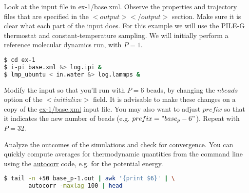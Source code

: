\documentclass{article}
\begin{document}
\begin{Exercise}[label={basic},title={A PIMD simulation of liquid water}]

\Question 
Look at the \ipi{} input file in \url{ex-1/base.xml}. Observe the 
properties and trajectory files that are specified in the \lstinxml$<output></output>$ section. 
Make sure it is clear what each part 
of the input does. For this example
we will use the PILE-G thermostat\cite{ceri+11jcp} and 
constant-temperature sampling. We will 
initially perform a reference molecular dynamics run, with $P=1$. 

\begin{lstlisting}[language=bash]
$ cd ex-1 
$ i-pi base.xml &> log.ipi &
$ lmp_ubuntu < in.water &> log.lammps & 
\end{lstlisting}%

\Question
Modify the input so that you'll run with
$P=6$ beads, by changing the \lstinxml$nbeads$ option of the \lstinxml$<initialize>$ field. 
It is advisable to make these changes on a copy of the  \url{ex-1/base.xml} input file.
You may also want to adjust \lstinxml$prefix$ so that it indicates the new number of beads (e.g. \lstinxml$prefix="base_p-6"$).
Repeat with $P=32$. 

\Question
Analyze the outcomes of the simulations and check for convergence. 
You can quickly compute averages for thermodynamic quantities from the command
line using the \url{autocorr} code, e.g. for the potential energy. 

\begin{lstlisting}[language=bash]
$ tail -n +50 base_p-1.out | awk '{print $6}' | \
       autocorr -maxlag 100 | head
\end{lstlisting}


\end{Exercise}
\end{document}
